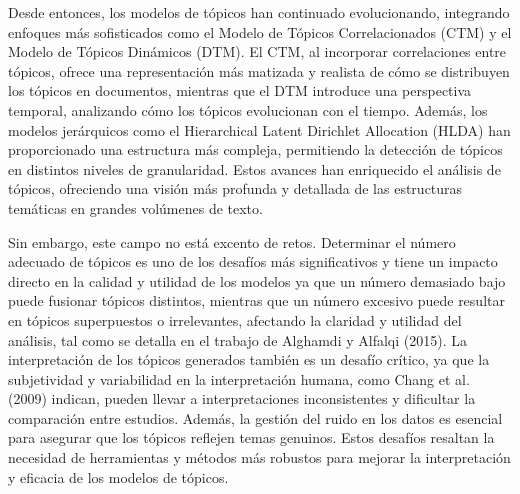 Desde entonces, los modelos de tópicos han continuado evolucionando, integrando enfoques más sofisticados como el Modelo de Tópicos Correlacionados (CTM) y el Modelo de Tópicos Dinámicos (DTM). El CTM, al incorporar correlaciones entre tópicos, ofrece una representación más matizada y realista de cómo se distribuyen los tópicos en documentos, mientras que el DTM introduce una perspectiva temporal, analizando cómo los tópicos evolucionan con el tiempo. Además, los modelos jerárquicos como el Hierarchical Latent Dirichlet Allocation (HLDA) han proporcionado una estructura más compleja, permitiendo la detección de tópicos en distintos niveles de granularidad. Estos avances han enriquecido el análisis de tópicos, ofreciendo una visión más profunda y detallada de las estructuras temáticas en grandes volúmenes de texto.


Sin embargo, este campo no est\'a excento de retos. Determinar el número adecuado de tópicos es uno de los desafíos más significativos y tiene un impacto directo en la calidad y utilidad de los modelos ya que un número demasiado bajo puede fusionar tópicos distintos, mientras que un número excesivo puede resultar en tópicos superpuestos o irrelevantes, afectando la claridad y utilidad del análisis, tal como se detalla en el trabajo de Alghamdi y Alfalqi (2015). La interpretación de los tópicos generados también es un desafío crítico, ya que la subjetividad y variabilidad en la interpretación humana, como Chang et al. (2009) indican, pueden llevar a interpretaciones inconsistentes y dificultar la comparación entre estudios. Además, la gestión del ruido en los datos es esencial para asegurar que los tópicos reflejen temas genuinos. Estos desafíos resaltan la necesidad de herramientas y métodos más robustos para mejorar la interpretación y eficacia de los modelos de tópicos. 

